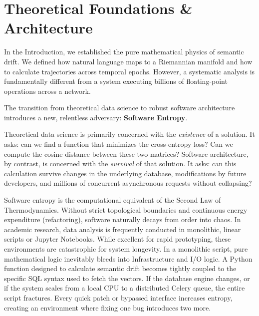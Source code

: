 
\chapter{Theoretical Foundations \& Architecture}

In the Introduction, we established the pure mathematical physics of semantic drift. We defined how natural language maps to a Riemannian manifold and how to calculate trajectories across temporal epochs. However, a systematic analysis is fundamentally different from a system executing billions of floating-point operations across a network.



The transition from theoretical data science to robust software architecture introduces a new, relentless adversary: \textbf{Software Entropy}.

Theoretical data science is primarily concerned with the \textit{existence} of a solution. It asks: can we find a function that minimizes the cross-entropy loss? Can we compute the cosine distance between these two matrices? Software architecture, by contrast, is concerned with the \textit{survival} of that solution. It asks: can this calculation survive changes in the underlying database, modifications by future developers, and millions of concurrent asynchronous requests without collapsing?

Software entropy is the computational equivalent of the Second Law of Thermodynamics. Without strict topological boundaries and continuous energy expenditure (refactoring), software naturally decays from order into chaos. In academic research, data analysis is frequently conducted in monolithic, linear scripts or Jupyter Notebooks. While excellent for rapid prototyping, these environments are catastrophic for system longevity. In a monolithic script, pure mathematical logic inevitably bleeds into Infrastructure and I/O logic. A Python function designed to calculate semantic drift becomes tightly coupled to the specific SQL syntax used to fetch the vectors. If the database engine changes, or if the system scales from a local CPU to a distributed Celery queue, the entire script fractures. Every quick patch or bypassed interface increases entropy, creating an environment where fixing one bug introduces two more.

